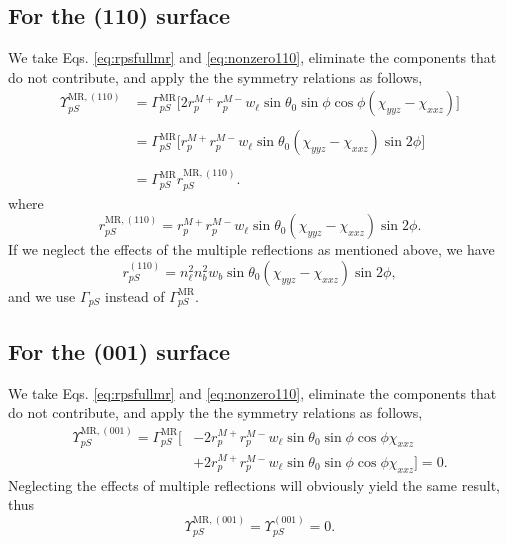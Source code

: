 \subsection{For the (110) surface}

We take Eqs. \eqref{eq:rpsfullmr} and \eqref{eq:nonzero110}, eliminate the
components that do not contribute, and apply the the symmetry relations as
follows,
\begin{equation*}
\begin{split}
\Upsilon^{\mathrm{MR},(110)}_{pS} &= 
\Gamma^{\mathrm{MR}}_{pS}
\big[
2r^{M+}_{p}r^{M-}_{p}w_{\ell}\sin\theta_{0}\sin\phi\cos\phi
(\chi_{yyz} - \chi_{xxz})
\big]\\\\\
&= 
\Gamma^{\mathrm{MR}}_{pS}
\big[
r^{M+}_{p}r^{M-}_{p}w_{\ell}\sin\theta_{0}(\chi_{yyz} - \chi_{xxz})\sin2\phi
\big]\\\\
&= 
\Gamma^{\mathrm{MR}}_{pS}r^{\mathrm{MR},(110)}_{pS}.
\end{split}
\end{equation*}
where
\begin{equation}\label{eq:final-rps.mr.110}
r^{\mathrm{MR},(110)}_{pS} =
r^{M+}_{p}r^{M-}_{p}w_{\ell}\sin\theta_{0}(\chi_{yyz} - \chi_{xxz})\sin2\phi.
\end{equation}
If we neglect the effects of the multiple reflections as mentioned above, we
have
\begin{equation}\label{eq:final-rps.110}
r^{(110)}_{pS} = 
n^{2}_{\ell}n^{2}_{b}w_{b}\sin\theta_{0}(\chi_{yyz} - \chi_{xxz})\sin2\phi,
\end{equation}
and we use $\Gamma_{pS}$ instead of $\Gamma^{\mathrm{MR}}_{pS}$.


\subsection{For the (001) surface}

We take Eqs. \eqref{eq:rpsfullmr} and \eqref{eq:nonzero110}, eliminate the
components that do not contribute, and apply the the symmetry relations as
follows,
\begin{equation*}
\begin{split}
\Upsilon^{\mathrm{MR},(001)}_{pS}
= 
\Gamma^{\mathrm{MR}}_{pS}
\big[
&- 2r^{M+}_{p}r^{M-}_{p}w_{\ell}\sin\theta_{0}\sin\phi\cos\phi\chi_{xxz}\\
&+ 2r^{M+}_{p}r^{M-}_{p}w_{\ell}\sin\theta_{0}\sin\phi\cos\phi\chi_{xxz}
\big] = 0.
\end{split}
\end{equation*}
Neglecting the effects of multiple reflections will obviously yield the same
result, thus
\begin{equation}\label{eq:final-rps.mr.001}
\Upsilon^{\mathrm{MR},(001)}_{pS} = \Upsilon^{(001)}_{pS} = 0.
\end{equation}


